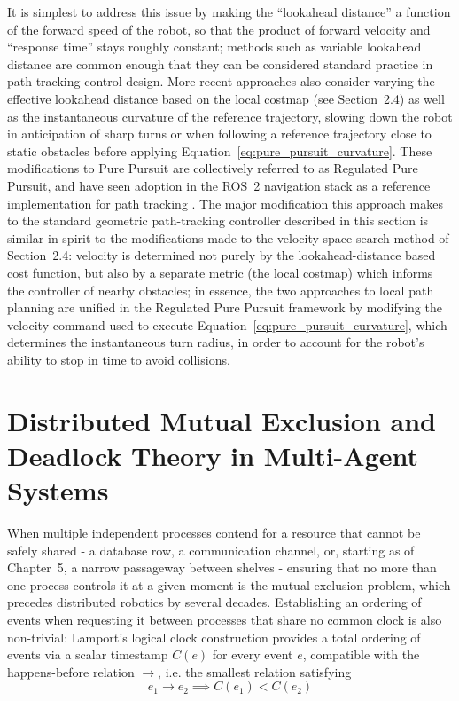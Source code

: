 It is simplest to address this issue by making the ``lookahead distance'' a function of the forward speed of the robot, so that the product of forward velocity and ``response time'' stays roughly constant; methods such as variable lookahead distance are common enough that they can be considered standard practice in path-tracking control design. More recent approaches also consider varying the effective lookahead distance based on the local costmap (see Section~2.4) as well as the instantaneous curvature of the reference trajectory, slowing down the robot in anticipation of sharp turns or when following a reference trajectory close to static obstacles before applying Equation~\eqref{eq:pure_pursuit_curvature}. These modifications to Pure Pursuit are collectively referred to as Regulated Pure Pursuit, and have seen adoption in the ROS~2 navigation stack as a reference implementation for path tracking \cite{macenski2023regulated}. The major modification this approach makes to the standard geometric path-tracking controller described in this section is similar in spirit to the modifications made to the velocity-space search method of Section~2.4: velocity is determined not purely by the lookahead-distance based cost function, but also by a separate metric (the local costmap) which informs the controller of nearby obstacles; in essence, the two approaches to local path planning are unified in the Regulated Pure Pursuit framework by modifying the velocity command used to execute Equation~\eqref{eq:pure_pursuit_curvature}, which determines the instantaneous turn radius, in order to account for the robot's ability to stop in time to avoid collisions.

\section{Distributed Mutual Exclusion and Deadlock Theory in Multi-Agent Systems}

When multiple independent processes contend for a resource that cannot be safely shared - a database row, a communication channel, or, starting as of Chapter~5, a narrow passageway between shelves - ensuring that no more than one process controls it at a given moment is the mutual exclusion problem, which precedes distributed robotics by several decades. Establishing an ordering of events when requesting it between processes that share no common clock is also non-trivial: Lamport's logical clock construction provides a total ordering of events via a scalar timestamp $C(e)$ for every event $e$, compatible with the happens-before relation $\rightarrow$, i.e. the smallest relation satisfying
\begin{equation}
e_1 \rightarrow e_2 \implies C(e_1) < C(e_2) \label{eq:lamport_clock_condition}
\end{equation}

